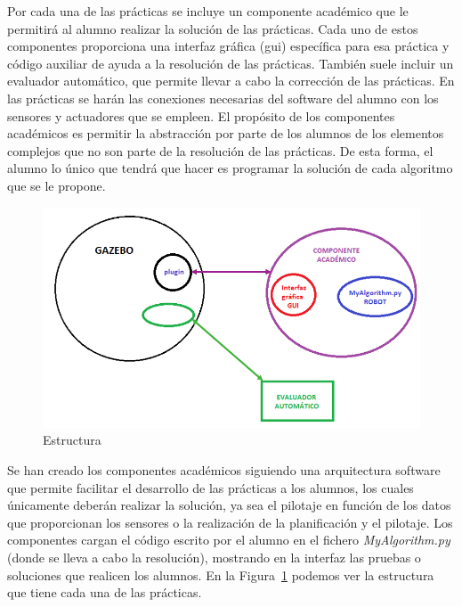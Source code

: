 Por cada una de las prácticas se incluye un componente académico que le permitirá al alumno realizar la solución de las prácticas. Cada uno de estos componentes proporciona una interfaz gráfica (\acrshort{gui}) específica para esa práctica y código auxiliar de ayuda a la resolución de las prácticas. También suele incluir un evaluador automático, que permite llevar a cabo la corrección de las prácticas. En las prácticas se harán las conexiones necesarias del software del alumno con los sensores y actuadores que se empleen. El propósito de los componentes académicos es permitir la abstracción por parte de los alumnos de los elementos complejos que no son parte de la resolución de las prácticas. De esta forma, el alumno lo único que tendrá que hacer es programar la solución de cada algoritmo que se le propone.
\begin{figure}[H]
  \begin{center}
    \includegraphics[width=1\textwidth]{figures/Introduccion/estructura.png}
		\caption{Estructura}
		\label{fig.estructura}
		\end{center}
\end{figure}

Se han creado los componentes académicos siguiendo una arquitectura software que permite facilitar el desarrollo de las prácticas a los alumnos, los cuales únicamente deberán realizar la solución, ya sea el pilotaje en función de los datos que proporcionan los sensores  o la realización de la planificación y el pilotaje. Los componentes cargan el código escrito por el alumno en el fichero \textit{MyAlgorithm.py} (donde se lleva a cabo la resolución), mostrando en la interfaz las pruebas o soluciones que realicen los alumnos. En la Figura~\ref{fig.estructura} podemos ver la estructura que tiene cada una de las prácticas.\\

